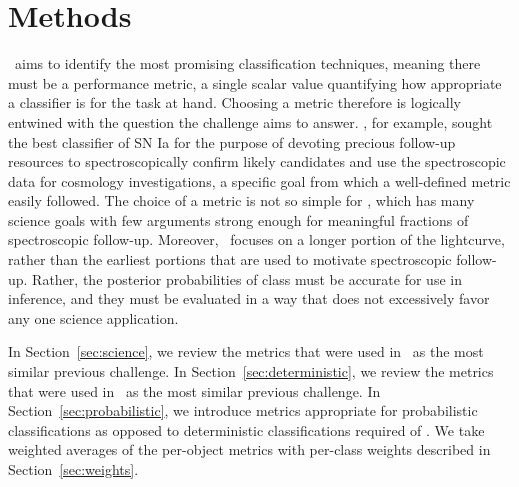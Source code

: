 \section{Methods}
\label{sec:methods}


\plasticc\ aims to identify the most promising classification techniques, meaning there must be a performance metric, a single scalar value quantifying how appropriate a classifier is for the task at hand.
Choosing a metric therefore is logically entwined with the question the challenge aims to answer.
\snphotcc, for example, sought the best classifier of SN Ia for the purpose of devoting precious follow-up resources to spectroscopically confirm likely candidates and use the spectroscopic data for cosmology investigations, a specific goal from which a well-defined metric easily followed.
The choice of a metric is not so simple for \plasticc, which has many science goals with few arguments strong enough for meaningful fractions of spectroscopic follow-up.
Moreover, \plasticc\ focuses on a longer portion of the lightcurve, rather than the earliest portions that are used to motivate spectroscopic follow-up.
Rather, the posterior probabilities of class must be accurate for use in inference, and they must be evaluated in a way that does not excessively favor any one science application.

In Section~\ref{sec:science}, we review the metrics that were used in \snphotcc\ as the most similar previous challenge.
In Section~\ref{sec:deterministic}, we review the metrics that were used in \snphotcc\ as the most similar previous challenge.
In Section~\ref{sec:probabilistic}, we introduce metrics appropriate for probabilistic classifications as opposed to deterministic classifications required of \snphotcc.
We take weighted averages of the per-object metrics with per-class weights described in Section~\ref{sec:weights}.

